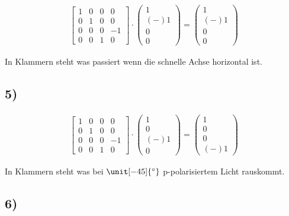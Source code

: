 \begin{align*}
\left[
\begin{matrix}
1 & 0 & 0 & 0 \\ 
0 & 1 & 0 & 0 \\ 
0 & 0 & 0 & -1 \\ 
0 & 0 & 1 & 0
\end{matrix} 
\right]
\cdot
\left(
\begin{matrix}
1 \\ 
(-)1 \\ 
0 \\ 
0
\end{matrix} 
\right)
=
\left(
\begin{matrix}
1 \\ 
(-)1 \\ 
0 \\ 
0
\end{matrix} 
\right)
\end{align*}

In Klammern steht was passiert wenn die schnelle Achse horizontal ist.

\subsection*{5)}

\begin{align*} 
\left[
\begin{matrix}
1 & 0 & 0 & 0 \\ 
0 & 1 & 0 & 0 \\ 
0 & 0 & 0 & -1 \\ 
0 & 0 & 1 & 0
\end{matrix} 
\right]
\cdot
\left(
\begin{matrix}
1 \\ 
0 \\ 
(-)1 \\ 
0
\end{matrix} 
\right)
=
\left(
\begin{matrix}
1 \\ 
0 \\ 
0 \\ 
(-)1
\end{matrix} 
\right)
\end{align*}

In Klammern steht was bei $\unit[-45]{^\circ}$ p-polarisiertem Licht rauskommt.

\subsection*{6)}

